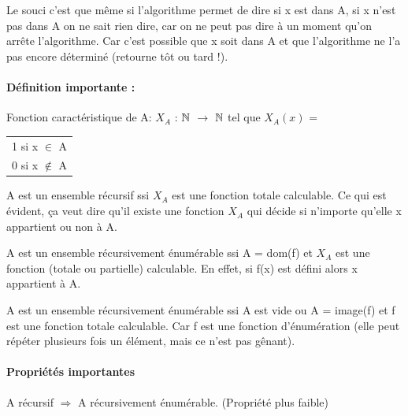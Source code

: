 \begin{myrem}
		Le souci c'est que même si l'algorithme permet de dire si x est dans A, si x
		n'est pas dans A on ne sait rien dire, car on ne peut pas dire à un moment qu'on
		arrête l'algorithme. Car c'est possible que x soit dans A et que l'algorithme ne
		l'a pas encore déterminé (retourne tôt ou tard !).
\end{myrem}

\paragraph{Définition importante :}
\label{par:d_finition_importante}

\begin{mydef}
	Fonction caractéristique de A:
	$X_A$ : $\mathbb{N}$ $\rightarrow$ $\mathbb{N}$ tel que $X_A(x)$ =
\begin{tabular}{l}
	1 si x $\in$ A \\	
	0 si x $\notin$ A 
\end{tabular}
\end{mydef}

\begin{mydef}
	A est un ensemble récursif ssi $X_A$ est une fonction totale calculable. Ce qui
	est évident, ça veut dire qu'il existe une fonction $X_A$ qui décide si n'importe
	qu'elle x appartient ou non à A.\\
\end{mydef}

\begin{mydef}
	A est un ensemble récursivement énumérable ssi A = dom(f) et $X_A$ est une 
	fonction (totale ou partielle) calculable. En effet, si f(x) est défini alors
	x appartient à A.\\
\end{mydef}

\begin{mydef}
	A est un ensemble récursivement énumérable ssi A est vide ou A = image(f) et f
	est une fonction totale calculable. Car f est une fonction d'énumération (elle
	peut répéter plusieurs fois un élément, mais ce n'est pas gênant).\\
\end{mydef}


\paragraph{Propriétés importantes}
\label{par:propri_t_s_importantes}
\begin{myprop}
	A récursif $\Rightarrow$ A récursivement énumérable. (Propriété plus
		faible)
\end{myprop}

